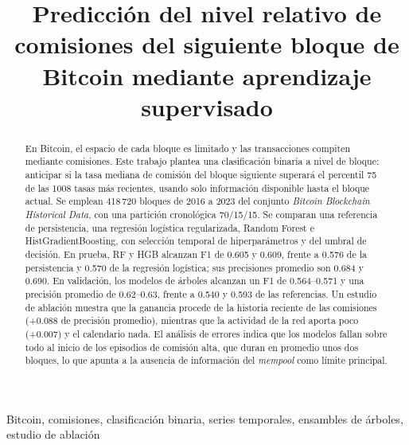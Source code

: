\documentclass[conference]{IEEEtran}
\begin{document}
\title{Predicción del nivel relativo de comisiones del siguiente bloque de Bitcoin mediante aprendizaje supervisado}

\author{
}

\maketitle

\begin{abstract}
En Bitcoin, el espacio de cada bloque es limitado y las transacciones compiten mediante comisiones. Este trabajo plantea una clasificación binaria a nivel de bloque: anticipar si la tasa mediana de comisión del bloque siguiente superará el percentil 75 de las 1008 tasas más recientes, usando solo información disponible hasta el bloque actual. Se emplean 418\,720 bloques de 2016 a 2023 del conjunto \textit{Bitcoin Blockchain Historical Data}, con una partición cronológica 70/15/15. Se comparan una referencia de persistencia, una regresión logística regularizada, Random Forest e HistGradientBoosting, con selección temporal de hiperparámetros y del umbral de decisión. En prueba, RF y HGB alcanzan F1 de 0.605 y 0.609, frente a 0.576 de la persistencia y 0.570 de la regresión logística; sus precisiones promedio son 0.684 y 0.690. En validación, los modelos de árboles alcanzan un F1 de 0.564--0.571 y una precisión promedio de 0.62--0.63, frente a 0.540 y 0.593 de las referencias. Un estudio de ablación muestra que la ganancia procede de la historia reciente de las comisiones (+0.088 de precisión promedio), mientras que la actividad de la red aporta poco (+0.007) y el calendario nada. El análisis de errores indica que los modelos fallan sobre todo al inicio de los episodios de comisión alta, que duran en promedio unos dos bloques, lo que apunta a la ausencia de información del \textit{mempool} como límite principal.
\end{abstract}

\begin{IEEEkeywords}
Bitcoin, comisiones, clasificación binaria, series temporales, ensambles de árboles, estudio de ablación
\end{IEEEkeywords}

\end{document}
